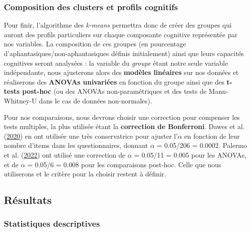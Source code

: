 \documentclass[
  12pt,
]{article}
\begin{document}
\hypertarget{composition-des-clusters-et-profils-cognitifs}{%
\subsubsection{Composition des clusters et profils
cognitifs}\label{composition-des-clusters-et-profils-cognitifs}}

Pour finir, l'algorithme des \emph{k-means} permettra donc de créer des
groupes qui auront des profils particuliers sur chaque composante
cognitive représentée par nos variables. La composition de ces groupes
(en pourcentage d'aphantasiques/non-aphantasiques définis initialement)
ainsi que leurs capacités cognitives seront analysées : la variable du
\emph{groupe} étant notre seule variable indépendante, nous ajusterons
alors des \textbf{modèles linéaires} sur nos données et réaliserons des
\textbf{ANOVAs univariées} en fonction du groupe ainsi que des
\textbf{t-tests post-hoc} (ou des ANOVAs non-paramétriques et des tests
de Mann-Whitney-U dans le cas de données non-normales).

Pour nos comparaisons, nous devrons choisir une correction pour
compenser les tests multiples, la plus utilisée étant la
\textbf{correction de Bonferroni}. Dawes et al.
(\protect\hyperlink{ref-dawesCognitiveProfileMultisensory2020}{2020}) en
ont utilisée une très conservatrice pour ajuster l'\(\alpha\) en
fonction de leur nombre d'items dans les questionnaires, donnant
\(\alpha\) = 0.05/206 = 0.0002. Palermo et al.
(\protect\hyperlink{ref-palermoCongenitalLackExtraordinary2022}{2022})
ont utilisé une correction de \(\alpha\) = 0.05/11 = 0.005 pour les
ANOVAs, et de \(\alpha\) = 0.05/6 = 0.008 pour les comparaisons
post-hoc. Celle que nous utiliserons et le critère pour la choisir
restent à définir.

\hypertarget{ruxe9sultats}{%
\subsection{Résultats}\label{ruxe9sultats}}

\hypertarget{statistiques-descriptives}{%
\subsubsection{Statistiques
descriptives}\label{statistiques-descriptives}}
\end{document}

